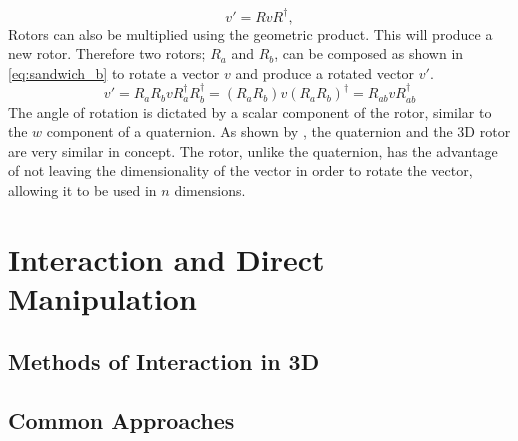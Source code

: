 \documentclass{l4proj}
\begin{document}
%
\begin{equation}
  \label{eq:sandwich_a}
    v' = R v R^\dagger,
\end{equation}
%
Rotors can also be multiplied using the geometric product. This will produce a new rotor. Therefore two rotors; $R_a$ and $R_b$, can be composed as shown in \cref{eq:sandwich_b} to rotate a vector \(v\) and produce a rotated vector \(v'\).
%
\begin{equation}
  \label{eq:sandwich_b}
  v' = R_a R_b v R_a^{\dagger} R_b^{\dagger}
   = (R_a R_b) v (R_a R_b)^{\dagger}
   = R_{ab}^{} v R_{ab}^{\dagger}
\end{equation}
%
The angle of rotation is dictated by a scalar component of the rotor, similar to the \(w\) component of a quaternion. 
As shown by \citep{bosch_code_nodate}, the quaternion and the 3D rotor are very similar in concept. The rotor, unlike the quaternion, has the advantage of not leaving the dimensionality of the vector in order to rotate the vector, allowing it to be used in \(n\) dimensions.

\section{Interaction and Direct Manipulation}
\label{background_rotation}

\subsection{Methods of Interaction in 3D}

\subsection*{Common Approaches}
\end{document}
